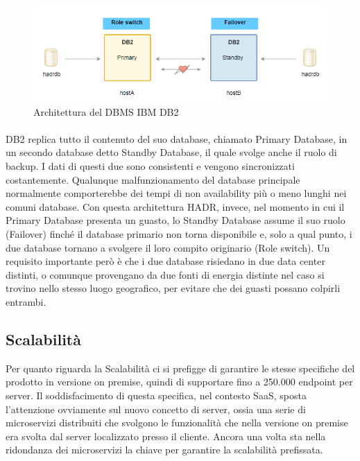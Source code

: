 \begin{figure}[h!]
	\centering
	\includegraphics[width=\textwidth,keepaspectratio=true]{capitoli/imgs/db2.PNG}
	\caption{Architettura del DBMS IBM DB2}
\end{figure}

\paragraph{}
DB2 replica tutto il contenuto del suo database, chiamato Primary Database, in un secondo database detto Standby Database, il quale svolge anche il ruolo di backup. I dati di questi due sono consistenti e vengono sincronizzati costantemente. Qualunque malfunzionamento del database principale normalmente comporterebbe dei tempi di non availability più o meno lunghi nei comuni database. Con questa architettura HADR, invece, nel momento in cui il Primary Database presenta un guasto, lo Standby Database assume il suo ruolo (Failover) finché il database primario non torna disponibile e, solo a qual punto, i due database tornano a svolgere il loro compito originario (Role switch). Un requisito importante però è che i due database risiedano in due data center distinti, o comunque provengano da due fonti di energia distinte nel caso si trovino nello stesso luogo geografico, per evitare che dei guasti possano colpirli entrambi. 

\subsection{Scalabilità}
Per quanto riguarda la Scalabilità ci si prefigge di garantire le stesse specifiche del prodotto in versione on premise, quindi di supportare fino a 250.000 endpoint per server. Il soddisfacimento di questa specifica, nel contesto SaaS, sposta l'attenzione ovviamente sul nuovo concetto di server, ossia una serie di microservizi distribuiti che svolgono le funzionalità che nella versione on premise era svolta dal server localizzato presso il cliente. Ancora una volta sta nella ridondanza dei microservizi la chiave per garantire la scalabilità prefissata.

